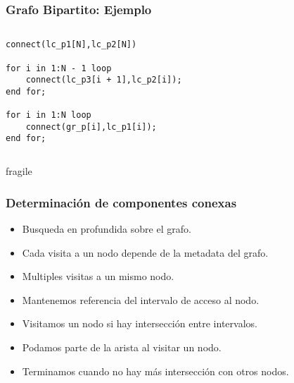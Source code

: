 \begin{frame}[fragile]
\frametitle{Grafo Bipartito: Ejemplo}
\begin{columns} 
\column[t]{7cm}  
\begin{lstlisting}[style=base]
connect(lc_p1[N],lc_p2[N])     
 
for i in 1:N - 1 loop
    connect(lc_p3[i + 1],lc_p2[i]);
end for;

for i in 1:N loop
    connect(gr_p[i],lc_p1[i]);
end for;
\end{lstlisting}

\column[t]{7cm}  

\end{columns}
\end{frame}

\begin{frame}{fragile}
\frametitle{Determinación de componentes conexas}
\begin{itemize}
\setlength\itemsep{1em}
\item Busqueda en profundida sobre el grafo. 
\item Cada visita a un nodo depende de la metadata del grafo.
\item Multiples visitas a un mismo nodo. 
\item Mantenemos referencia del intervalo de acceso al nodo. 
\item Visitamos un nodo si hay intersección entre intervalos.
\item Podamos parte de la arista al visitar un nodo.
\item Terminamos cuando no hay más intersección con otros nodos.
\end{itemize}
\end{frame}


